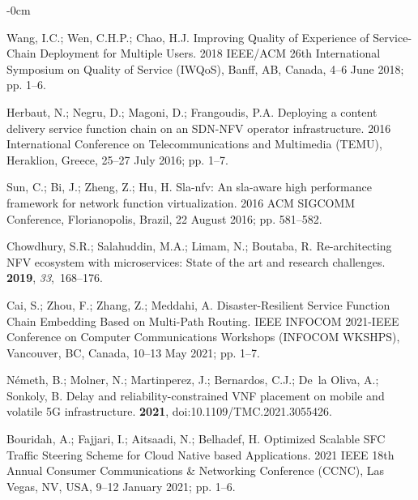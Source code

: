 \documentclass[futureinternet,review,accept,pdftex,moreauthors]{Definitions/mdpi}
\begin{document}
\begin{adjustwidth}{-\extralength}{0cm}
\begin{thebibliography}{999}
Wang, I.C.; Wen, C.H.P.; Chao, H.J.
\newblock Improving Quality of Experience of Service-Chain Deployment for
  Multiple Users.
 2018 IEEE/ACM 26th International Symposium on Quality of Service
  (IWQoS),  Banff, AB, Canada, 4--6 June 2018; pp. 1--6.

Herbaut, N.; Negru, D.; Magoni, D.; Frangoudis, P.A.
\newblock Deploying a content delivery service function chain on an SDN-NFV
  operator infrastructure.
  2016 International Conference on Telecommunications and Multimedia
  (TEMU),  Heraklion, Greece,  25--27 July 2016; pp. 1--7.

Sun, C.; Bi, J.; Zheng, Z.; Hu, H.
\newblock Sla-nfv: An sla-aware high performance framework for network function
  virtualization.
 2016 ACM SIGCOMM Conference, Florianopolis, Brazil, 22 August 2016; pp. 581--582.

Chowdhury, S.R.; Salahuddin, M.A.; Limam, N.; Boutaba, R.
\newblock Re-architecting NFV ecosystem with microservices: State of the art
  and research challenges.
 {\bf 2019}, {\em 33},~168--176.

Cai, S.; Zhou, F.; Zhang, Z.; Meddahi, A.
\newblock Disaster-Resilient Service Function Chain Embedding Based on
  Multi-Path Routing.
 IEEE INFOCOM 2021-IEEE Conference on Computer Communications
  Workshops (INFOCOM WKSHPS),  Vancouver, BC, Canada,  10--13 May 2021; pp. 1--7.

N{\'e}meth, B.; Molner, N.; Martinperez, J.; Bernardos, C.J.; De~la Oliva, A.;
  Sonkoly, B.
\newblock Delay and reliability-constrained VNF placement on mobile and
  volatile 5G infrastructure.
 {\bf 2021}, {doi:10.1109/TMC.2021.3055426.} %


Bouridah, A.; Fajjari, I.; Aitsaadi, N.; Belhadef, H.
\newblock Optimized Scalable SFC Traffic Steering Scheme for Cloud Native based
  Applications.
 2021 IEEE 18th Annual Consumer Communications \& Networking
  Conference (CCNC),  Las Vegas, NV, USA, 9--12 January 2021; pp. 1--6.


\end{thebibliography}
\end{adjustwidth}
\end{document}
